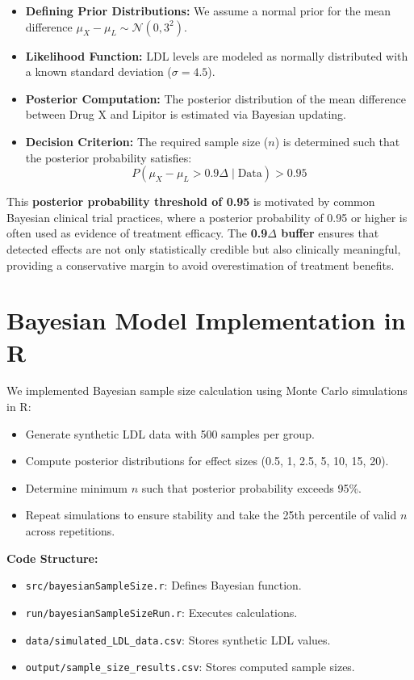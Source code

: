 \documentclass{article}
\begin{document}
	\begin{itemize}
		\item \textbf{Defining Prior Distributions:} We assume a normal prior for the mean difference $\mu_X - \mu_L \sim \mathcal{N}(0, 3^2)$.
		\item \textbf{Likelihood Function:} LDL levels are modeled as normally distributed with a known standard deviation ($\sigma = 4.5$).
		\item \textbf{Posterior Computation:} The posterior distribution of the mean difference between Drug X and Lipitor is estimated via Bayesian updating.
		\item \textbf{Decision Criterion:} The required sample size ($n$) is determined such that the posterior probability satisfies: 
		\begin{equation}
			P(\mu_X - \mu_L > 0.9\Delta \mid \text{Data}) > 0.95
		\end{equation}
	\end{itemize}

	This \textbf{posterior probability threshold of 0.95} is motivated by common Bayesian clinical trial practices, where a posterior probability of 0.95 or higher is often used as evidence of treatment efficacy. 
	The \textbf{0.9$\Delta$ buffer} ensures that detected effects are not only statistically credible but also clinically meaningful, providing a conservative margin to avoid overestimation of treatment benefits.
	
	\section{Bayesian Model Implementation in R}
	We implemented Bayesian sample size calculation using Monte Carlo simulations in R:
	\begin{itemize}
		\item Generate synthetic LDL data with 500 samples per group.
		\item Compute posterior distributions for effect sizes (0.5, 1, 2.5, 5, 10, 15, 20).
		\item Determine minimum $n$ such that posterior probability exceeds 95\%.
		\item Repeat simulations to ensure stability and take the 25th percentile of valid $n$ across repetitions.
	\end{itemize}
	
	\textbf{Code Structure:}
	\begin{itemize}
		\item \texttt{src/bayesianSampleSize.r}: Defines Bayesian function.
		\item \texttt{run/bayesianSampleSizeRun.r}: Executes calculations.
		\item \texttt{data/simulated\_LDL\_data.csv}: Stores synthetic LDL values.
		\item \texttt{output/sample\_size\_results.csv}: Stores computed sample sizes.
	\end{itemize}
	
\end{document}
